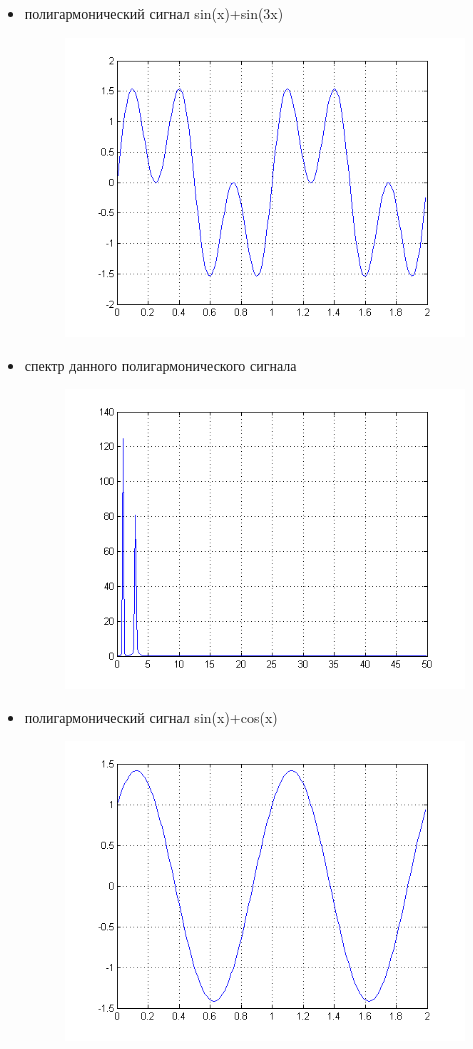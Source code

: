 \documentclass[10pt,a4paper]{article}
\begin{document}
\begin{itemize}
\item полигармонический сигнал sin(x)+sin(3x)
\begin{figure}[h]
\centering
\includegraphics[width=12cm]{5_1.png} 
\end{figure}
\item спектр данного полигармонического сигнала
\begin{figure}[h]
\centering
\includegraphics[width=12cm]{5_2.png} 
\end{figure}
\item полигармонический сигнал sin(x)+cos(x)
\begin{figure}[h]
\centering
\includegraphics[width=12cm]{12.png} 

\end{figure}
\end{itemize}
\end{document}
